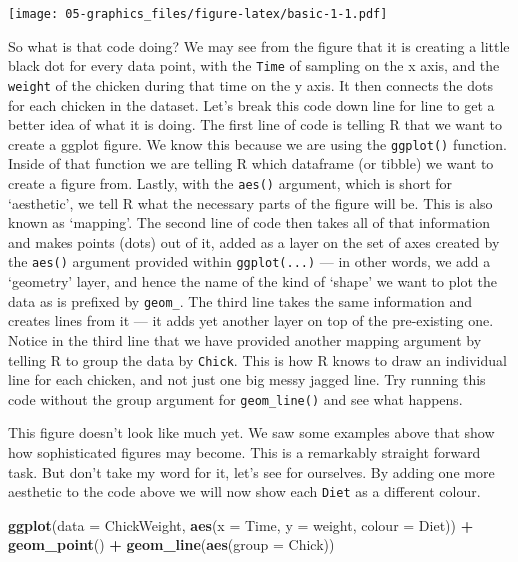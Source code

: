 \documentclass[
]{book}
\newenvironment{Shaded}{\begin{snugshade}}{\end{snugshade}}
\newcommand{\DataTypeTok}[1]{\textcolor[rgb]{0.13,0.29,0.53}{#1}}
\newcommand{\KeywordTok}[1]{\textcolor[rgb]{0.13,0.29,0.53}{\textbf{#1}}}
\newcommand{\NormalTok}[1]{#1}
\newcommand{\OperatorTok}[1]{\textcolor[rgb]{0.81,0.36,0.00}{\textbf{#1}}}
\newcommand{\StringTok}[1]{\textcolor[rgb]{0.31,0.60,0.02}{#1}}
\begin{document}
\texttt{[image: 05-graphics\_files/figure-latex/basic-1-1.pdf]}

So what is that code doing? We may see from the figure that it is creating a little black dot for every data point, with the \texttt{Time} of sampling on the x axis, and the \texttt{weight} of the chicken during that time on the y axis. It then connects the dots for each chicken in the dataset. Let's break this code down line for line to get a better idea of what it is doing. The first line of code is telling R that we want to create a ggplot figure. We know this because we are using the \texttt{ggplot()} function. Inside of that function we are telling R which dataframe (or tibble) we want to create a figure from. Lastly, with the \texttt{aes()} argument, which is short for `aesthetic', we tell R what the necessary parts of the figure will be. This is also known as `mapping'. The second line of code then takes all of that information and makes points (dots) out of it, added as a layer on the set of axes created by the \texttt{aes()} argument provided within \texttt{ggplot(...)} --- in other words, we add a `geometry' layer, and hence the name of the kind of `shape' we want to plot the data as is prefixed by \texttt{geom\_}. The third line takes the same information and creates lines from it --- it adds yet another layer on top of the pre-existing one. Notice in the third line that we have provided another mapping argument by telling R to group the data by \texttt{Chick}. This is how R knows to draw an individual line for each chicken, and not just one big messy jagged line. Try running this code without the group argument for \texttt{geom\_line()} and see what happens.

This figure doesn't look like much yet. We saw some examples above that show how sophisticated figures may become. This is a remarkably straight forward task. But don't take my word for it, let's see for ourselves. By adding one more aesthetic to the code above we will now show each \texttt{Diet} as a different colour.

\begin{Shaded}
\begin{Highlighting}[]
\KeywordTok{ggplot}\NormalTok{(}\DataTypeTok{data =}\NormalTok{ ChickWeight, }\KeywordTok{aes}\NormalTok{(}\DataTypeTok{x =}\NormalTok{ Time, }\DataTypeTok{y =}\NormalTok{ weight, }\DataTypeTok{colour =}\NormalTok{ Diet)) }\OperatorTok{+}
\StringTok{  }\KeywordTok{geom\_point}\NormalTok{() }\OperatorTok{+}
\StringTok{  }\KeywordTok{geom\_line}\NormalTok{(}\KeywordTok{aes}\NormalTok{(}\DataTypeTok{group =}\NormalTok{ Chick))}
\end{Highlighting}
\end{Shaded}
\end{document}
